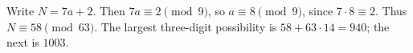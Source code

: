 Write $N=7a+2$. Then $7a\equiv2\pmod9$, so $a\equiv8\pmod9$, since $7\cdot8\equiv2$. Thus $N\equiv58\pmod{63}$. The largest three-digit possibility is $58+63\cdot14=\boxed{940}$; the next is $1003$.
